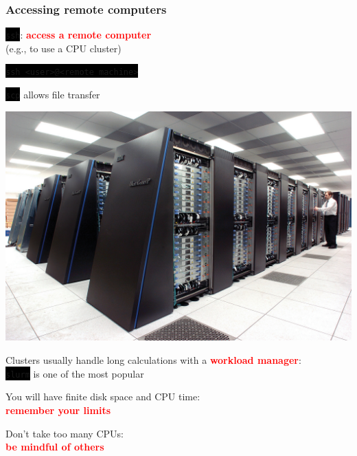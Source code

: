 \documentclass[unknownkeysallowed, 10pt, a4 paper, handout]{beamer}
\newcommand{\focus}[1]{\textbf{\textcolor{red}{#1}}}
\newcommand{\code}[1]{\colorbox{black}{\color{green}\texttt{#1}}}
\newcommand{\sidebyside}[5]{
  \begin{minipage}{#1\textwidth}
    #2
  \end{minipage} #3 \begin{minipage}{#4\textwidth}
    #5
  \end{minipage}
}
\begin{document}
\begin{frame}
  \begin{center}
    \frametitle{Accessing remote computers}

    \sidebyside{0.50}{
      \centering

      \code{ssh}: \focus{access a remote computer}\\
      (e.g., to use a CPU cluster)\\

      \vspace{4mm}

      \code{ssh <user>@<remote machine>}

      \vspace{4mm}

      \code{scp} allows file transfer
    }{\hfill}{0.45}{
      \begin{center}
        \includegraphics[width=1.00\textwidth]{pics/supercomputer.jpg}
      \end{center}
    }

    \vspace{3mm}

    Clusters usually handle long calculations with a \focus{workload manager}:\\
    \code{slurm} is one of the most popular

    \vspace{3mm}

    You will have finite disk space and CPU time:\\
    \focus{remember your limits}

    \vspace{3mm}

    Don't take too many CPUs:\\
    \focus{be mindful of others}
  \end{center}
\end{frame}
\end{document}
